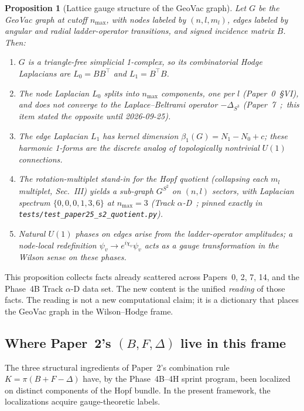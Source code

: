 \documentclass[aps,pra,twocolumn,superscriptaddress,longbibliography]{revtex4-2}
\newtheorem{proposition}{Proposition}
\begin{document}
\begin{proposition}[Lattice gauge structure of the GeoVac graph]
\label{prop:gauge_structure}
Let $G$ be the GeoVac graph at cutoff $n_{\max}$, with nodes labeled
by $(n, l, m_l)$, edges labeled by angular and radial ladder-operator
transitions, and signed incidence matrix $B$.  Then:
\begin{enumerate}
\item $G$ is a triangle-free simplicial 1-complex, so its
  combinatorial Hodge Laplacians are $L_0 = B B^{\top}$ and
  $L_1 = B^{\top} B$.
\item The node Laplacian $L_0$ splits into $n_{\max}$ components, one
  per $l$ (Paper~0~\S VI), and does \emph{not} converge to the
  Laplace--Beltrami operator $-\Delta_{S^3}$ (Paper~7~\cite{Paper7};\
  this item stated the opposite until 2026-09-25).
\item The edge Laplacian $L_1$ has kernel dimension
  $\beta_1(G) = N_1 - N_0 + c$; these harmonic 1-forms are the
  discrete analog of topologically nontrivial $U(1)$ connections.
\item The rotation-multiplet stand-in for the Hopf quotient
  (collapsing each $m_l$ multiplet, Sec.~III) yields a
  sub-graph $G^{S^2}$ on $(n, l)$ sectors, with Laplacian spectrum
  $\{0, 0, 0, 1, 3, 6\}$ at $n_{\max} = 3$ (Track
  $\alpha$-D~\cite{Paper2}; pinned exactly in
  \texttt{tests/test\_paper25\_s2\_quotient.py}).
\item Natural $U(1)$ phases on edges arise from the
  ladder-operator amplitudes; a node-local redefinition
  $\psi_v \to e^{i\chi_v} \psi_v$ acts as a gauge transformation in
  the Wilson sense on these phases.
\end{enumerate}
\end{proposition}

This proposition collects facts already scattered across
Papers~0, 2, 7, 14, and the Phase~4B Track $\alpha$-D data set.  The
new content is the unified \emph{reading} of those facts.  The reading
is not a new computational claim; it is a dictionary that places the
GeoVac graph in the Wilson--Hodge frame.

\subsection{Where Paper~2's $(B, F, \Delta)$ live in this frame}

The three structural ingredients of Paper~2's combination
rule $K = \pi(B + F - \Delta)$ have, by the Phase~4B--4H sprint
program, been localized on distinct components of the Hopf bundle.
In the present framework, the localizations acquire gauge-theoretic
labels.
\end{document}
